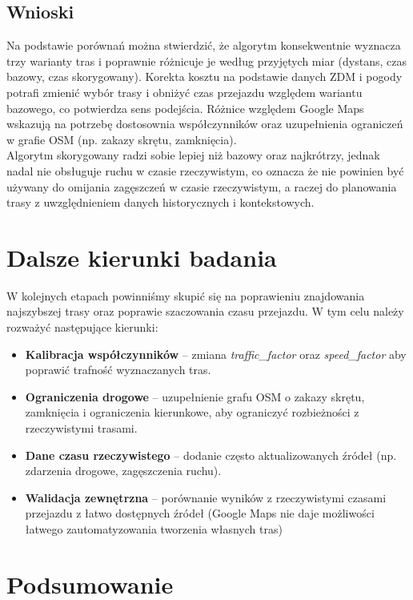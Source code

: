 \documentclass[12pt]{article}
\begin{document}
\subsection{Wnioski}
Na podstawie porównań można stwierdzić, że algorytm konsekwentnie wyznacza trzy warianty tras
i poprawnie różnicuje je według przyjętych miar (dystans, czas bazowy, czas skorygowany).
Korekta kosztu na podstawie danych ZDM i pogody potrafi zmienić wybór trasy i obniżyć czas
przejazdu względem wariantu bazowego, co potwierdza sens podejścia. Różnice względem Google Maps
wskazują na potrzebę dostosownia współczynników oraz uzupełnienia ograniczeń w grafie OSM
(np. zakazy skrętu, zamknięcia). \\
Algorytm skorygowany radzi sobie lepiej niż bazowy oraz najkrótrzy, jednak nadal nie obsługuje 
ruchu w czasie rzeczywistym, co oznacza że nie powinien być używany do omijania zagęszczeń w
czasie rzeczywistym, a raczej do planowania trasy z uwzględnieniem danych historycznych i kontekstowych.

\section{Dalsze kierunki badania}
W kolejnych etapach powinniśmy skupić się na poprawieniu znajdowania najszybszej trasy oraz
poprawie szaczowania czasu przejazdu. W tym celu należy rozważyć następujące kierunki:
\begin{itemize}
    \item \textbf{Kalibracja współczynników} -- zmiana \textit{traffic\_factor} oraz
    \textit{speed\_factor} aby poprawić trafność wyznaczanych tras.
    \item \textbf{Ograniczenia drogowe} -- uzupełnienie grafu OSM o zakazy skrętu,
    zamknięcia i ograniczenia kierunkowe, aby ograniczyć rozbieżności z rzeczywistymi trasami.
    \item \textbf{Dane czasu rzeczywistego} -- dodanie często aktualizowanych źródeł
    (np. zdarzenia drogowe, zagęszczenia ruchu).
    \item \textbf{Walidacja zewnętrzna} -- porównanie wyników z rzeczywistymi czasami przejazdu z łatwo dostępnych źródeł (Google Maps nie daje możliwości łatwego zautomatyzowania tworzenia własnych tras)
\end{itemize}


\section{Podsumowanie}
\end{document}
